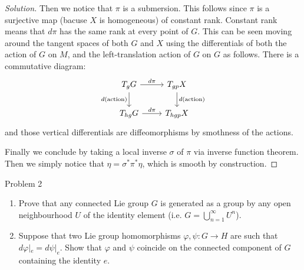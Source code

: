 \begin{proof}[Solution]
Then we notice that $\pi$ is a submersion. This follows since $\pi$ is a surjective map (bacuse $X$ is homogeneous)  of constant rank. Constant rank means that $d\pi$ has the same rank at every point of $G$. This can be seen moving around the tangent spaces of both  $G$ and $X$ using the differentials of both the action of  $G$ on $M$, and the left-translation action of $G$ on $G$ as follows. There is a commutative diagram:
\[\begin{tikzcd}
	T_gG\arrow[r,"d\pi"]\arrow[d,swap,"d(\text{action}) "]&T_{gp}X\arrow[d,"d(\text{action})" ]\\
	T_{hg}G\arrow[r,"d\pi"]&T_{hgp}X
\end{tikzcd}\]
and those vertical differentials are diffeomorphisms by smothness of the actions.

Finally we conclude by taking a local inverse $\sigma$ of $\pi$ via inverse function theorem. Then we simply notice that $\eta=\sigma ^*\pi^*\eta$, which is smooth by construction.
\end{proof}

\begin{idea4}{Problem 2}\leavevmode
	\begin{enumerate}[label=\alph*.]
		\item Prove that any connected Lie group $G$ is generated as a group by any open neighbourhood $U$ of the identity element (i.e. $G=\bigcup_{n=1}^\infty U^n$).
		\item Suppose that two Lie group homomorphisms $\varphi,\psi:G\to H$ are such that $d\varphi|_{e}=d\psi|_{e}$. Show that $\varphi$ and $\psi$ coincide on the connected component of $G$ containing the identity $e$.
	\end{enumerate}
\end{idea4}

